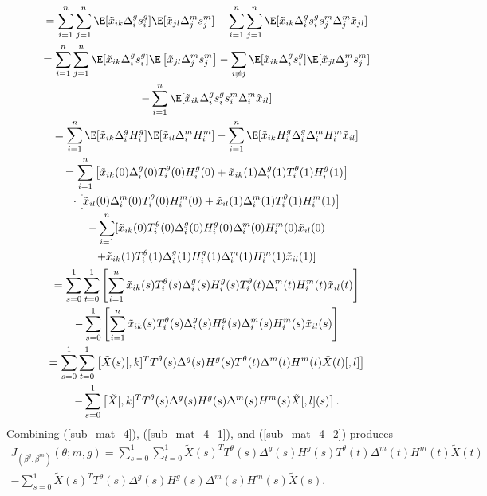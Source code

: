 \documentclass[12pt]{article}
\begin{document}
\begin{appendices}
\begin{multline}
= \sum_{i=1}^n \sum_{j=1}^n \E[\tilde{x}_{ik} \Delta^g_is^g_i] \E[ \tilde{x}_{jl} \Delta^m_j s^m_j ] - \sum_{i=1}^n \sum_{j=1}^n \E[ \tilde{x}_{ik} \Delta^g_i s^g_i s^m_j \Delta^m_j \tilde{x}_{jl}]  \\
= \sum_{i=1}^n \sum_{j=1}^n \E[ \tilde{x}_{ik} \Delta^g_i s^g_i] \E \left[\tilde{x}_{jl} \Delta^m_j s^m_j \right]  - \sum_{i \neq j} \E[\tilde{x}_{ik} \Delta^g_i s^g_i] \E[\tilde{x}_{jl}\Delta^m_j  s^m_j ] \\ - \sum_{i=1}^n \E[\tilde{x}_{ik} \Delta^g_i s^g_i s^m_i \Delta^m_i \tilde{x}_{il}] \\
= \sum_{i=1}^n \E[\tilde{x}_{ik} \Delta^g_i H^g_i] \E[\tilde{x}_{il} \Delta_i^m H^m_i] - \sum_{i=1}^n \E[\tilde{x}_{ik} H_i^g \Delta_i^g \Delta_i^m H_i^m \tilde{x}_{il}] \\ 
= \sum_{i=1}^n \left[\tilde{x}_{ik}(0) {\Delta}^g_i(0) T^\theta_i(0) {H}^g_i(0) + \tilde{x}_{ik}(1) {\Delta}^g_i(1) T^\theta_i(1) {H}^g_i(1)\right] \\ 
\cdot \left[\tilde{x}_{il}(0) {\Delta}^m_i(0) T^\theta_i(0) {H}^m_i(0) + \tilde{x}_{il}(1) {\Delta}^m_i(1) T^\theta_i(1) {H}^m_i(1)\right] 
\\ - \sum_{i=1}^n [\tilde{x}_{ik}(0) T^\theta_i(0) {\Delta}^g_i(0) {H}^g_i(0) {\Delta}^m_i(0) {H}^m_i(0) \tilde{x}_{il}(0) \\ + \tilde{x}_{ik}(1) T^\theta_i(1) {\Delta}^g_i(1) {H}^g_i(1) {\Delta}^m_i(1) {H}^m_i(1) \tilde{x}_{il}(1) ] 
\\ = \sum_{s=0}^1 \sum_{t=0}^1 \left[\sum_{i=1}^n \tilde{x}_{ik}(s) T^\theta_i(s) {\Delta}^g_i(s) {H}^g_i(s) T^\theta_i(t){\Delta}^m_i(t) {H}^m_i(t) \tilde{x}_{il}(t) \right]
\\ - \sum_{s=0}^1 \left[\sum_{i=1}^n \tilde{x}_{ik}(s) T^\theta_i(s) {\Delta}^g_i(s) {H}^g_i(s) {\Delta}^m_i(s) {H}^m_i(s) \tilde{x}_{il}(s)\right] 
\\ = \sum_{s=0}^1 \sum_{t=0}^1 \left[ \tilde{X}(s)[,k]^T T^\theta(s) {\Delta}^g(s) {H}^g(s) T^\theta(t){\Delta}^m(t) {H}^m(t) \tilde{X}(t)[,l] \right]\\ - \sum_{s=0}^1 \left[ \tilde{X}[,k]^T T^\theta(s) {\Delta}^g(s) {H}^g(s) {\Delta}^m(s) {H}^m(s) \tilde{X}[,l](s)\right].
\end{multline}
Combining (\ref{sub_mat_4}), (\ref{sub_mat_4_1}), and (\ref{sub_mat_4_2}) produces
\begin{multline}\label{sub_mat_4_formula}
J_{(\beta^g, \beta^m)}(\theta; m, g) = \sum_{s=0}^1 \sum_{t=0}^1 \tilde{X}(s)^T  T^\theta(s) {\Delta}^g(s) {H}^g(s) T^\theta(t){\Delta}^m(t) {H}^m(t) \tilde{X}(t) \\ - \sum_{s=0}^1 \tilde{X}(s)^T T^\theta(s) {\Delta}^g(s) {H}^g(s) {\Delta}^m(s) {H}^m(s) \tilde{X}(s).
\end{multline}
\\ \noindent

\end{appendices}
\end{document}
